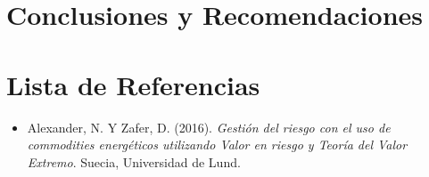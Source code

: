 \documentclass[a4paper,12pt]{Latex/Classes/PhDthesisPSnPDF}
\begin{document}



\chapter*{Conclusiones y Recomendaciones}




\chapter*{Lista de Referencias}

\begin{itemize}

\item Alexander, N. Y Zafer, D. (2016). \textit{Gestión del riesgo con el uso de commodities energéticos utilizando Valor en riesgo y Teoría del Valor Extremo}. Suecia, Universidad de Lund.

\end{itemize}
\end{document}
